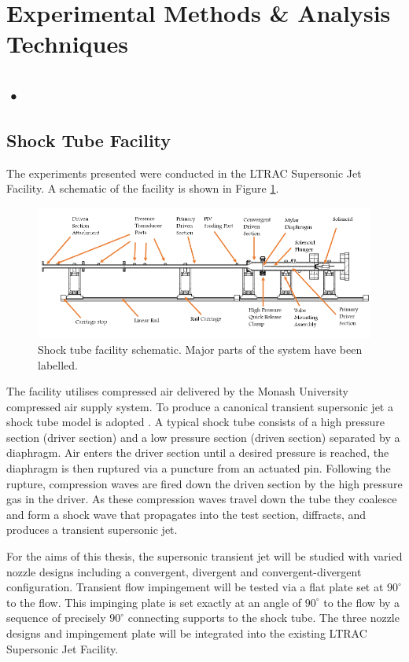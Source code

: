 \newpage
\section{Experimental Methods \& Analysis Techniques}
\subsection{•}
\subsection{Shock Tube Facility}
The experiments presented were conducted in the LTRAC Supersonic Jet Facility. A schematic of the facility is shown in Figure \ref{fig:shocktube}. 

\begin{figure}[H] 
	\centering
	\includegraphics[width=1\textwidth]{fig9.PNG} 
	\caption{Shock tube facility schematic. Major parts of the
		system have been labelled.}
	\label{fig:shocktube}
\end{figure}	

The facility utilises compressed air delivered by the Monash University compressed air supply system. To produce a canonical transient supersonic jet a shock tube model is adopted \cite{john1962shock}. A typical shock tube consists of a high pressure section (driver section) and a low pressure section (driven section) separated by a diaphragm. Air enters the driver section until a desired pressure is reached, the diaphragm is then ruptured via a puncture from an actuated pin. Following the rupture, compression waves are fired down the driven section by the high pressure gas in the driver. As these compression waves travel down the tube they coalesce and form a shock wave that propagates into the test section, diffracts, and produces a transient supersonic jet. 

For the aims of this thesis, the supersonic transient jet will be studied with varied nozzle designs including a convergent, divergent and convergent-divergent configuration. Transient flow impingement will be tested via a flat plate set at $90^\circ$ to the flow. This impinging plate is set exactly at an angle of $90^\circ$ to the flow by a sequence of precisely $90^\circ$ connecting supports to the shock tube. The three nozzle designs and impingement plate will be integrated into the existing LTRAC Supersonic Jet Facility.

